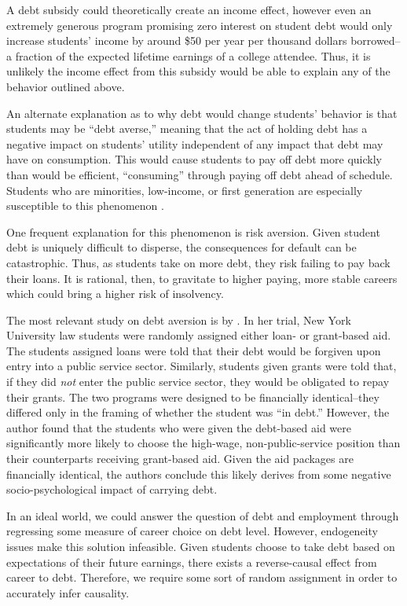 \documentclass{article}
\begin{document}
	A debt subsidy could theoretically create an income effect, however even an extremely generous program promising zero interest on student debt would only increase students' income by around \$50 per year per thousand dollars borrowed--a fraction of the expected lifetime earnings of a college attendee. Thus, it is unlikely the income effect from this subsidy would be able to explain any of the behavior outlined above.
	
	An alternate explanation as to why debt would change students' behavior is that students may be ``debt averse,'' meaning that the act of holding debt has a negative impact on students' utility independent of any impact that debt may have on consumption. This would cause students to pay off debt more quickly than would be efficient, ``consuming'' through paying off debt ahead of schedule. Students who are minorities, low-income, or first generation are especially susceptible to this phenomenon \parencite{burdman2005, field2009, callender2005}. 
	
	One frequent explanation for this phenomenon is risk aversion. Given student debt is uniquely difficult to disperse, the consequences for default can be catastrophic. Thus, as students take on more debt, they risk failing to pay back their loans. It is rational, then, to gravitate to higher paying, more stable careers which could bring a higher risk of insolvency. 
	
	The most relevant study on debt aversion is by \textcite{field2009}. In her trial, New York University law students were randomly assigned either loan- or grant-based aid. The students assigned loans were told that their debt would be forgiven upon entry into a public service sector. Similarly, students given grants were told that, if they did \emph{not} enter the public service sector, they would be obligated to repay their grants. The two programs were designed to be financially identical--they differed only in the framing of whether the student was ``in debt.'' However, the author found that the students who were given the debt-based aid were significantly more likely to choose the high-wage, non-public-service position than their counterparts receiving grant-based aid. Given the aid packages are financially identical, the authors conclude this likely derives from some negative socio-psychological impact of carrying debt.
	
	In an ideal world, we could answer the question of debt and employment through regressing some measure of career choice on debt level. However, endogeneity issues make this solution infeasible. Given students choose to take debt based on expectations of their future earnings, there exists a reverse-causal effect from career to debt. Therefore, we require some sort of random assignment in order to accurately infer causality. 
	
\end{document}
